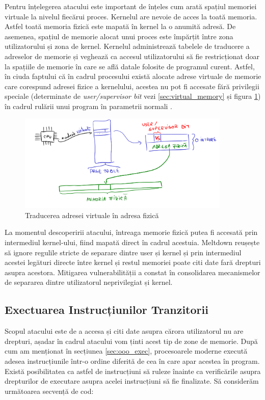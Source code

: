 Pentru înțelegerea atacului este important de înțeles cum arată spațiul
memoriei virtuale la nivelul fiecărui proces. Kernelul are nevoie de acces la
toată memoria. Astfel toată memoria fizică este mapată în kernel la o anumită
adresă. De asemenea, spațiul de memorie alocat unui proces este împărțit între
zona utilizatorului și zona de kernel. Kernelul administrează tabelele de
traducere a adreselor de memorie și veghează ca accesul utilizatorului să fie
restricționat doar la spațiile de memorie în care se află datale folosite de
programul curent. Astfel, în ciuda faptului că în cadrul procesului există
alocate adrese virtuale de memorie care corespund adresei fizice a kernelului,
acestea nu pot fi accesate fără privilegii speciale (determinate de
\emph{user/supervisor bit} vezi \ref{sec:virtual_memory} și figura
\ref{fig:vmem}) în cadrul rulării unui program în parametrii normali
\cite{kernel}. 

\begin{figure}[ht]
	\centering
	\includegraphics[width=0.9\textwidth]{images/vmem.png}
  \caption{Traducerea adresei virtuale în adresa fizică}
  \label{fig:vmem}
\end{figure}

La momentul descoperirii atacului, întreaga memorie fizică putea fi accesată
prin intermediul kernel-ului, fiind mapată direct în cadrul acestuia. Meltdown
reușește să ignore regulile stricte de separare dintre user și kernel și prin
intermediul acestei legături directe între kernel și restul memoriei poate citi
date fară drepturi asupra acestora. Mitigarea vulnerabilității a constat în
consolidarea mecanismelor de separarea dintre utilizatorul neprivilegiat și
kernel.

\subsection{Exectuarea Instrucțiunilor Tranzitorii}

Scopul atacului este de a accesa și citi date asupra cărora utilizatorul nu are
drepturi, așadar în cadrul atacului vom ținti acest tip de zone de memorie.
După cum am menționat în secțiunea \ref{sec:ooo_exec}, procesoarele moderne
execută adesea instrucțiunile într-o ordine diferită de cea în care apar
acestea în program. Există posibilitatea ca astfel de instrucțiuni să ruleze
înainte ca verificările asupra drepturilor de executare asupra acelei
instrucțiuni să fie finalizate. Să considerăm următoarea secvență de cod:

